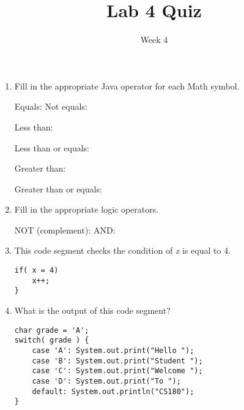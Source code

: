 \documentclass[addpoints]{exam}
\title{Lab 4 Quiz}
\date{Week 4}
\begin{document}
 

\Instructions
\begin{enumerate}
\newline
\item {}
Fill in the appropriate Java operator for each Math symbol.

\begin{oneparchoices} 
\hspace{0.2cm}

 \choice Equals:   \vspace{1em} 
 \newline
 \choice Not equals:   \vspace{1em}
 \newline 

 \choice Less than:   \vspace{1em}
 \newline 

 \choice Less than or equals:   \vspace{1em}
 \newline 

 \choice Greater than:   \vspace{1em}
 \newline

 \choice Greater than or equals: 
    \newline

 \end{oneparchoices}
 

 
\item {}
Fill in the appropriate logic operators.

\begin{oneparchoices} 
\hspace{0.2cm}
\vspace{2em}
 
 \choice NOT (complement): 
 \newline
 \choice AND:  \vspace{1em}

 
 \end{oneparchoices}
 

 \item {} \tf
This code segment checks the condition of \textit{x} is equal to 4.
\begin{lstlisting}
if( x = 4)
    x++;
}

\end{lstlisting}


\item {}
What is the output of this code segment?
\begin{lstlisting}
char grade = 'A';
switch( grade ) {
    case 'A': System.out.print("Hello ");
    case 'B': System.out.print("Student ");
    case 'C': System.out.print("Welcome ");
    case 'D': System.out.print("To ");
    default: System.out.println("CS180");
}


\end{lstlisting}
\end{enumerate}
\end{document}
